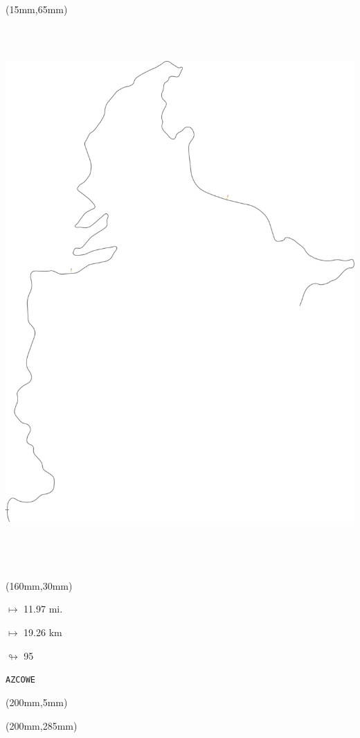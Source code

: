 \begin{textblock*}{185mm}(15mm,65mm)%
\centering
\mbox{\includegraphics[width=185mm,height=210mm,keepaspectratio]{PT/AZCOWE.pdf}}
\end{textblock*}
\begin{textblock*}{40mm}(160mm,30mm)%
\Large
\par$\mapsto$ 11.97 mi.
\par$\mapsto$ 19.26 km
\par$\looparrowright$ 95
\par\hfill\tiny\tt AZCOWE\\
\end{textblock*}
\begin{textblock*}{20mm}(200mm,5mm)%
\fbox{\thepage}
\label{AZCOWE}
\end{textblock*}
\begin{textblock*}{20mm}(200mm,285mm)%
\fbox{\thepage}
\end{textblock*}

